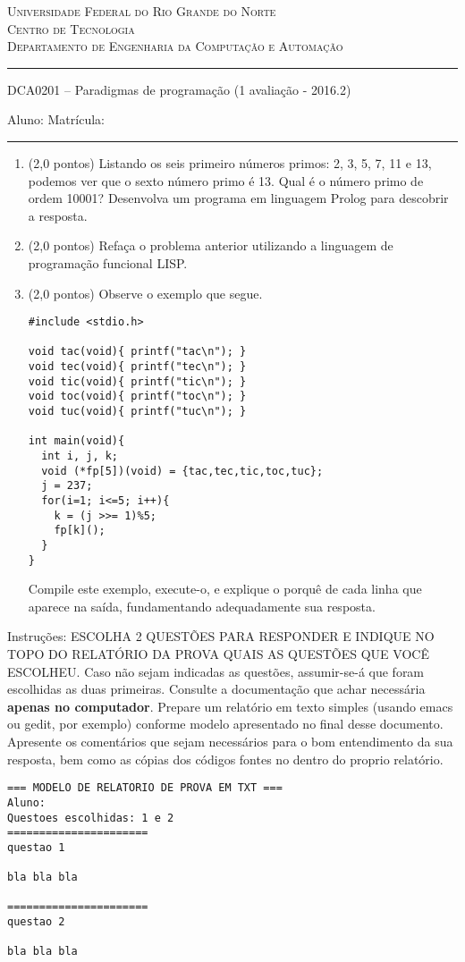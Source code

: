 \documentclass[12pt,a4paper]{article}
\begin{document}
\begin{flushright}\scshape
  Universidade Federal do Rio Grande do Norte\\
  Centro de Tecnologia\\
  Departamento de Engenharia da Computação e Automação\\
  \rule{\linewidth}{1pt}
\end{flushright}

\begin{center}\Large
DCA0201 -- Paradigmas de programação (1\raisebox{0.5ex}{\small a} avaliação - 2016.2)\\
\end{center}
\noindent Aluno:\hrulefill \vspace{2mm} Matrícula: \rule{2.5cm}{0.4pt}

\begin{enumerate}
\item (2,0 pontos) Listando os seis primeiro números primos: 2, 3, 5, 7, 11 e 13,
  podemos ver que o sexto número primo é 13. Qual é o número primo de
  ordem 10001? Desenvolva um programa em linguagem Prolog para
  descobrir a resposta.
\item (2,0 pontos) Refaça o problema anterior utilizando a linguagem
  de programação funcional LISP.

\item (2,0 pontos) Observe o exemplo que segue.
\begin{verbatim}
#include <stdio.h>

void tac(void){ printf("tac\n"); }
void tec(void){ printf("tec\n"); }
void tic(void){ printf("tic\n"); }
void toc(void){ printf("toc\n"); }
void tuc(void){ printf("tuc\n"); }

int main(void){
  int i, j, k;
  void (*fp[5])(void) = {tac,tec,tic,toc,tuc};
  j = 237;
  for(i=1; i<=5; i++){
    k = (j >>= 1)%5;
    fp[k]();
  }
}
\end{verbatim}
  Compile este exemplo, execute-o, e explique o porquê de cada linha
  que aparece na saída, fundamentando adequadamente sua resposta.
\end{enumerate}
Instruções: ESCOLHA 2 QUESTÕES PARA RESPONDER E INDIQUE NO TOPO DO
RELATÓRIO DA PROVA QUAIS AS QUESTÕES QUE VOCÊ ESCOLHEU. Caso não sejam
indicadas as questões, assumir-se-á que foram escolhidas as duas
primeiras. Consulte a documentação que achar necessária {\bf apenas no
  computador}. Prepare um relatório em texto simples (usando emacs ou
gedit, por exemplo) conforme modelo apresentado no final desse
documento. Apresente os comentários que sejam necessários para o bom
entendimento da sua resposta, bem como as cópias dos códigos fontes no
dentro do proprio relatório.
\begin{verbatim}
=== MODELO DE RELATORIO DE PROVA EM TXT ===
Aluno:
Questoes escolhidas: 1 e 2
======================
questao 1

bla bla bla

======================
questao 2

bla bla bla

\end{verbatim}
\end{document}
